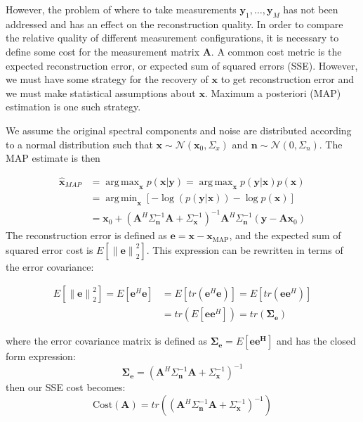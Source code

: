 \documentclass{article}
\renewcommand{\vec}[1]{\ensuremath{\mathbf{#1}}}
\providecommand{\vx}{\vec{x}}
\providecommand{\vy}{\vec{y}}
\providecommand{\ve}{\vec{e}}
\providecommand{\vn}{\vec{n}}
\providecommand{\vA}{\vec{A}}
\providecommand{\norm}[1]{\left\lVert#1\right\rVert}
\DeclareMathOperator*{\argmin}{arg\,min}
\DeclareMathOperator*{\argmax}{arg\,max}
\begin{document}
However, the problem of where to take measurements $\vy_1, \dots, \vy_M$ has not
been addressed and has an effect on the reconstruction quality.  In order to
compare the relative quality of different measurement configurations, it is
necessary to define some cost for the measurement matrix $\vA$.  A common cost
metric is the expected reconstruction error, or expected sum of squared errors
(SSE). However, we must have some strategy for the recovery of $\vx$ to get
reconstruction error and we must make statistical assumptions about $\vx$.
Maximum a posteriori (MAP) estimation is one such strategy.

We assume the original spectral components and noise are distributed according to a
normal distribution such that $\vx \sim \mathcal{N}(\vx_0, \Sigma_x)$ and
$\vn \sim \mathcal{N}(0, \Sigma_n)$.  The MAP estimate is then

$$
\begin{aligned}
  \hat{\vx}_{MAP} &= \argmax_{\vx} p(\vx | \vy)
  = \argmax_{\vx} p(\vy|\vx) p(\vx)\\
  &= \argmin_{\vx} \left[  - \log(p(\vy|\vx)) - \log
  p(\vx)\right] \\
  &= \vx_0 + \left( \vA^H\Sigma_{\vn}^{-1} \vA +
    \Sigma_{\vx}^{-1}\right)^{-1}
    \vA^H \Sigma_{\vn}^{-1} (\vy - \vA \vx_0)
\end{aligned}
$$
The reconstruction error is defined as $\ve = \vx - \vx_{\text{MAP}}$,
and the expected sum of squared error cost is $E[\norm{\ve}_2^2]$. This
expression can be rewritten in terms of the error covariance:

\begin{align*}
E[\norm{\ve}_2^2] =  E[\bm{e}^H\bm{e}] & = E[tr(\bm{e}^H\bm{e})] = E[tr(\bm{e}\bm{e}^H)] \\
& = tr(E[\bm{e}\bm{e}^H]) = tr(\bm{\Sigma_e})
\end{align*}

where the error covariance matrix is defined as $\bm{\Sigma_e} =
E[\bm{e}\bm{e^H}]$ and has the closed form expression:
\begin{equation}
\bm{\Sigma_e} = \left( \bm A^H\Sigma_{\bm{n}}^{-1} \bm A +
    \Sigma_{\bm{x}}^{-1}\right)^{-1}
\end{equation}
then our SSE cost becomes:
\begin{equation}
\text{Cost}(\bm{A}) = tr\left(\left( \bm A^H\Sigma_{\bm{n}}^{-1} \bm A +
    \Sigma_{\bm{x}}^{-1}\right)^{-1}\right)
\label{eq:sse-cost}
\end{equation}
\end{document}
